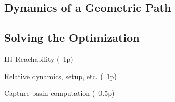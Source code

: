\subsection{Dynamics of a Geometric Path}

\subsection{Solving the Optimization}

HJ Reachability (~1p)

Relative dynamics, setup, etc. (~1p)

Capture basin computation (~0.5p)